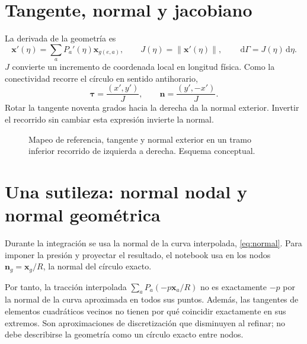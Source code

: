 \documentclass[11pt,a4paper]{report}
\numberwithin{equation}{chapter}
\newcommand{\vect}[1]{\bm{#1}}
\newcommand{\dd}{\,\mathrm{d}}
\newcommand{\norm}[1]{\left\lVert#1\right\rVert}
\begin{document}
\section{Tangente, normal y jacobiano}
La derivada de la geometr\'ia es
\begin{equation}
 \vect x'(\eta)=\sum_aP_a'(\eta)\vect x_{g(e,a)},\qquad
 J(\eta)=\norm{\vect x'(\eta)},\qquad
 \dd\Gamma=J(\eta)\dd\eta.
\end{equation}
$J$ convierte un incremento de coordenada local en longitud f\'isica.
Como la conectividad recorre el c\'irculo en sentido antihorario,
\begin{equation}
 \vect\tau=\frac{(x',y')}{J},\qquad
 \boxed{\vect n=\frac{(y',-x')}{J}.}
 \label{eq:normal}
\end{equation}
Rotar la tangente noventa grados hacia la derecha da la normal exterior.
Invertir el recorrido sin cambiar esta expresi\'on invierte la normal.

\begin{figure}[htbp]
\centering
{}
\caption{Mapeo de referencia, tangente y normal exterior en un tramo
inferior recorrido de izquierda a derecha. Esquema conceptual.}
\end{figure}

\section{Una sutileza: normal nodal y normal geom\'etrica}
Durante la integraci\'on se usa la normal de la curva interpolada,
\eqref{eq:normal}. Para imponer la presi\'on y proyectar el resultado,
el notebook usa en los nodos $\vect n_g=\vect x_g/R$, la normal del
c\'irculo exacto.

Por tanto, la tracci\'on interpolada
$\sum_aP_a(-p\vect x_a/R)$ no es exactamente $-p$ por la normal de la
curva aproximada en todos sus puntos. Adem\'as, las tangentes de elementos
cuadr\'aticos vecinos no tienen por qu\'e coincidir exactamente en sus
extremos. Son aproximaciones de discretizaci\'on que disminuyen al refinar;
no debe describirse la geometr\'ia como un c\'irculo exacto entre nodos.
\end{document}
